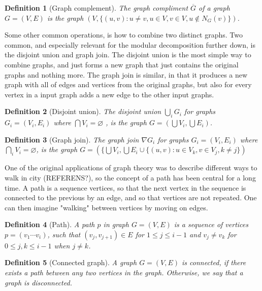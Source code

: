 \documentclass{amsart}
\newtheorem{definition}{Definition}[section]
\begin{document}
\begin{definition}[Graph complement]
    The graph compliment $\overline{G}$ of a graph $G = (V,E)$ is the graph 
    $(V,\{ (u,v) : u \neq v, u \in V,v \in V, u \notin N_G(v) \})$.
\end{definition}

Some other common operations, is how to combine two distinct graphs. Two common,
and especially relevant for the modular decomposition further down, is the
disjoint union and graph join. The disjoint union is the most simple way to
combine graphs, and just forms a new graph that just contains the original graphs
and nothing more. 
The graph join is similar, in that it produces a new graph with all of edges
and vertices from the original graphs, but also for every vertex in a
input graph adds a new edge to the other input graphs.

\begin{definition}[Disjoint union]
    The disjoint union $\bigcup_i G_i$ for graphs $G_i = (V_i,E_i)$ where 
    $\bigcap V_i = \varnothing $ , is the graph
    $G = \left( \bigcup V_i,\bigcup E_i \right)$.
\end{definition}

\begin{definition}[Graph join]
    The graph join $\nabla G_i$ for graphs $G_i = (V_i,E_i)$ where 
    $\bigcap_i V_i = \varnothing$, is the graph $G = (\{\bigcup V_i,
    \bigcup E_i \cup \{(u,v) : u \in V_k, v \in V_j, k \neq j \})$
\end{definition}


One of the original applications of graph theory was to describe different ways
to walk in city (REFERENS?), so the concept of a path has been central for a long
time.  A path is a sequence vertices, so that the next vertex in the sequence is
connected to the previous by an edge, and so that vertices are not repeated.
One can then imagine "walking" between vertices by moving on edges.

\begin{definition}[Path]
    A path $p$ in graph $G = (V,E)$ is a sequence of vertices $p = (v_1\cdots
    v_i)$, such that $(v_j,v_{j+1}) \in E$ for $1 \leq j \leq i-1$ and $v_j \neq v_k$ 
    for $0 \leq j,k \leq i-1$ when $j \neq k$.
\end{definition}

\begin{definition}[Connected graph]
    A graph $G = (V,E)$ is connected, if there exists a path between any two
    vertices in the graph. Otherwise, we say that a graph is disconnected.
\end{definition}
\end{document}
